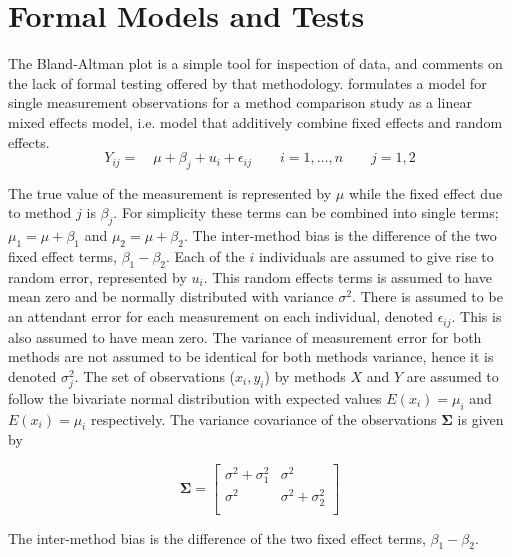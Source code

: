 \documentclass[Main.tex]{subfiles}
\begin{document}
	
	

\section{Formal Models and Tests}
The Bland-Altman plot is a simple tool for inspection of data, and
\citet{Kinsella} comments on the lack of formal testing offered by
that methodology. \citet{Kinsella} formulates a model for
single measurement observations for a method comparison study as a
linear mixed effects model, i.e. model that additively combine
fixed effects and random effects.
\[
Y_{ij} =\quad \mu + \beta_{j} + u_{i} + \epsilon_{ij} \qquad i = 1,\dots,n
\qquad j=1,2\]

The true value of the measurement is represented by $\mu$ while the fixed effect due to method $j$ is $\beta_{j}$.
For simplicity these terms can be combined into single terms; $\mu_{1} = \mu+ \beta_{1}$ and $\mu_{2} = \mu + \beta_{2}$. The inter-method bias is the difference of the two fixed effect terms, $\beta_{1}-\beta_{2}$. Each of the $i$ individuals are assumed to give rise to random error, represented by $u_{i}$. This random effects terms is assumed to have mean zero and be normally distributed with variance $\sigma^2$. There is assumed to be an attendant error for each measurement on each individual, denoted $\epsilon_{ij}$. This is also assumed to have mean zero. The variance of measurement error for both methods are not assumed to be identical for both methods variance,  hence it is denoted $\sigma^2_{j}$. The set of observations ($x_{i},y_{i}$) by methods $X$ and $Y$ are assumed to follow the bivariate normal distribution with expected values $E(x_{i})= \mu_{i}$ and $E(x_{i})= \mu_{i}$ respectively. The variance covariance of the observations $\boldsymbol{\Sigma}$ is given by

\[
\boldsymbol{\Sigma} = \left[
\begin{array}{cc}
\sigma^{2} + \sigma^{2}_{1} & \sigma^{2} \\
\sigma^{2} & \sigma^{2} + \sigma^{2}_{2} \\
\end{array}
\right]
\]

The inter-method bias is the difference of the two fixed effect terms, $\beta_{1}-\beta_{2}$.
\end{document}
